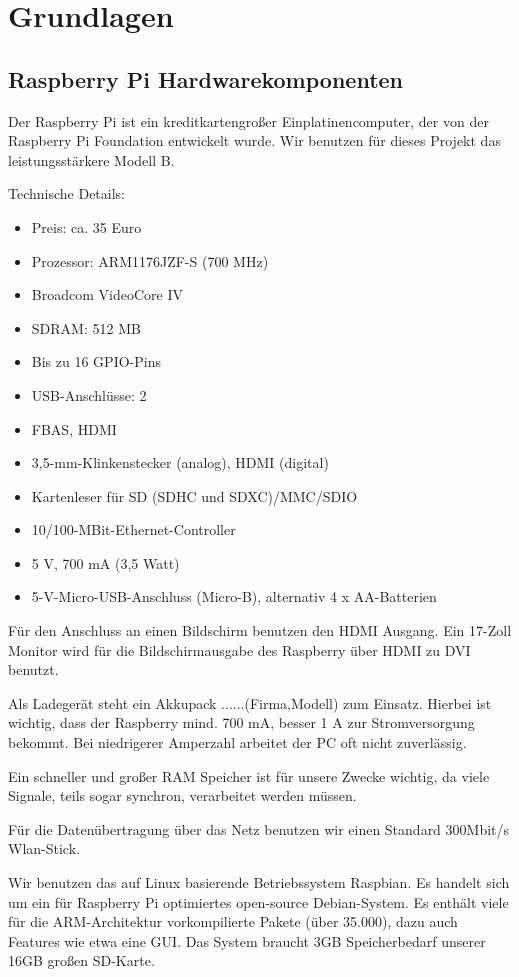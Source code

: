 \documentclass[12pt]{article}
\begin{document}
\section{Grundlagen}

\subsection{Raspberry Pi Hardwarekomponenten}

Der Raspberry Pi ist ein kreditkartengroßer Einplatinencomputer, der von der Raspberry Pi Foundation entwickelt wurde.
Wir benutzen für dieses Projekt das leistungsstärkere Modell B.

Technische Details:

\begin{itemize}
\item Preis: ca. 35 Euro
\item Prozessor: ARM1176JZF-S (700 MHz)
\item Broadcom VideoCore IV
\item SDRAM: 512 MB
\item Bis zu 16 GPIO-Pins
\item USB-Anschlüsse: 2
\item FBAS, HDMI
\item 3,5-mm-Klinkenstecker (analog), HDMI (digital)
\item Kartenleser für SD (SDHC und SDXC)/MMC/SDIO
\item 10/100-MBit-Ethernet-Controller 
\item 5 V, 700 mA (3,5 Watt)
\item 5-V-Micro-USB-Anschluss (Micro-B), alternativ 4 x AA-Batterien
\end{itemize}

Für den Anschluss an einen Bildschirm benutzen den HDMI Ausgang.
Ein 17-Zoll Monitor wird für die Bildschirmausgabe des Raspberry über HDMI zu DVI benutzt.

Als Ladegerät steht ein Akkupack ......(Firma,Modell) zum Einsatz. 
Hierbei ist wichtig, dass der Raspberry mind. 700 mA, besser 1 A zur Stromversorgung bekommt. 
Bei niedrigerer Amperzahl arbeitet der PC oft nicht zuverlässig.

Ein schneller und großer RAM Speicher ist für unsere Zwecke wichtig, da viele Signale, teils sogar synchron, verarbeitet werden müssen.

Für die Datenübertragung über das Netz benutzen wir einen Standard 300Mbit/s Wlan-Stick.

Wir benutzen das auf Linux basierende Betriebssystem Raspbian.
Es handelt sich um ein für Raspberry Pi optimiertes open-source Debian-System.
Es enthält viele für die ARM-Architektur vorkompilierte Pakete (über 35.000), dazu auch Features wie etwa eine GUI.
Das System braucht 3GB Speicherbedarf unserer 16GB großen SD-Karte.
\end{document}
